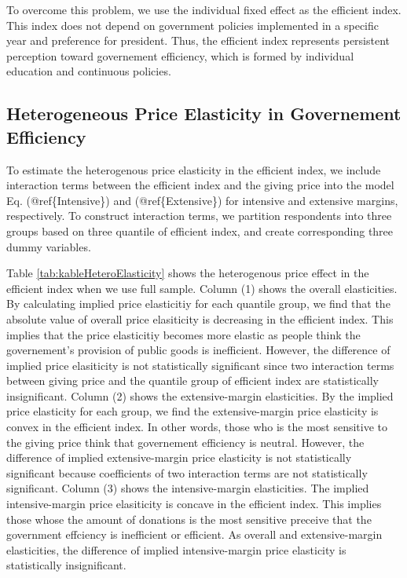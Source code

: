 \documentclass[ review  , 3p ]{elsarticle}
\begin{document}
  To overcome this problem, we use the individual fixed effect as the efficient index.
  This index does not depend on government policies implemented in a specific year and preference for president.
  Thus, the efficient index represents persistent perception toward governement efficiency,
  which is formed by individual education and continuous policies.

  \hypertarget{heterogeneous-price-elasticity-in-governement-efficiency}{%
  \subsection{Heterogeneous Price Elasticity in Governement Efficiency}\label{heterogeneous-price-elasticity-in-governement-efficiency}}

  To estimate the heterogenous price elasticity in the efficient index,
  we include interaction terms between the efficient index and the giving price
  into the model Eq. (@ref\{Intensive\}) and (@ref\{Extensive\}) for intensive and extensive margins, respectively.
  To construct interaction terms, we partition respondents into three groups based on three quantile of efficient index,
  and create corresponding three dummy variables.

  Table \ref{tab:kableHeteroElasticity} shows the heterogenous price effect in the efficient index
  when we use full sample.
  Column (1) shows the overall elasticities.
  By calculating implied price elasticitiy for each quantile group,
  we find that the absolute value of overall price elasiticity is decreasing in the efficient index.
  This implies that the price elasticitiy becomes more elastic
  as people think the governement's provision of public goods is inefficient.
  However,
  the difference of implied price elasiticity is not statistically significant
  since two interaction terms between giving price and the quantile group of efficient index are statistically insignificant.
  Column (2) shows the extensive-margin elasticities.
  By the implied price elasticity for each group,
  we find the extensive-margin price elasticity is convex in the efficient index.
  In other words, those who is the most sensitive to the giving price think that
  governement efficiency is neutral.
  However, the difference of implied extensive-margin price elasticity is not statistically significant
  because coefficients of two interaction terms are not statistically significant.
  Column (3) shows the intensive-margin elasticities.
  The implied intensive-margin price elasiticity is concave in the efficient index.
  This implies those whose the amount of donations is the most sensitive preceive that
  the government effciency is inefficient or efficient.
  As overall and extensive-margin elasticities,
  the difference of implied intensive-margin price elasticity is statistically insignificant.
\end{document}
